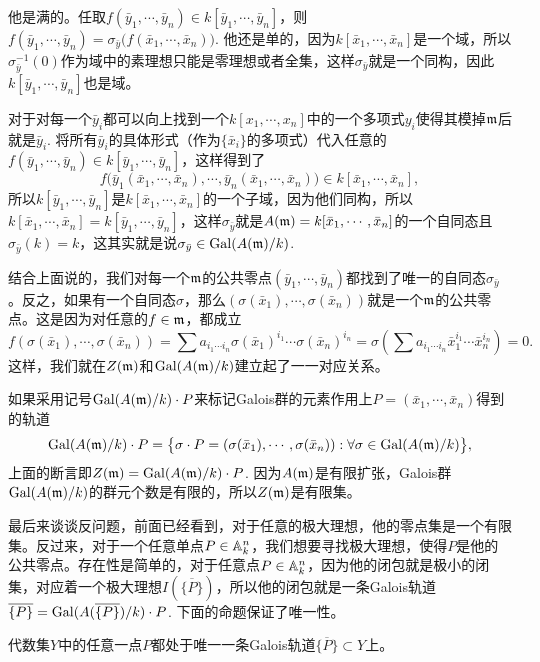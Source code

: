 他是满的。任取$f(\bar{y}_1,\cdots,\bar{y}_n)\in k[\bar{y}_1,\cdots,\bar{y}_n]$，则$f(\bar{y}_1,\cdots,\bar{y}_n)=\sigma_{\bar{y}}\bigl(f(\bar{x}_1,\cdots,\bar{x}_n)\bigr)$. 
他还是单的，因为$k[\bar{x}_1,\cdots,\bar{x}_n]$是一个域，所以$\sigma_{\bar{y}}^{-1}(0)$作为域中的素理想只能是零理想或者全集，这样$\sigma_{\bar{y}}$就是一个同构，因此$k[\bar{y}_1,\cdots,\bar{y}_n]$也是域。

对于对每一个$\bar{y}_i$都可以向上找到一个$k[x_1,\cdots,x_n]$中的一个多项式$y_i$使得其模掉$\mathfrak{m}$后就是$\bar{y}_i$.
将所有$\bar{y}_i$的具体形式（作为$\{\bar{x}_i\}$的多项式）代入任意的$f(\bar{y}_1,\cdots,\bar{y}_n) \in k[\bar{y}_1,\cdots,\bar{y}_n]$，这样得到了
\[
	f\bigl(\bar{y}_1(\bar{x}_1,\cdots,\bar{x}_n),\cdots,\bar{y}_n(\bar{x}_1,\cdots,\bar{x}_n)\bigr) \in k[\bar{x}_1,\cdots,\bar{x}_n],
\]
所以$k[\bar{y}_1,\cdots,\bar{y}_n]$是$k[\bar{x}_1,\cdots,\bar{x}_n]$的一个子域，因为他们同构，所以$k[\bar{x}_1,\cdots,\bar{x}_n]=k[\bar{y}_1,\cdots,\bar{y}_n]$，这样$\sigma_{\bar{y}}$就是$A(\mathfrak{m})=k[\bar{x}_1,\cdots,\bar{x}_n]$的一个自同态且$\sigma_{\bar{y}}(k)=k$，这其实就是说$\sigma_{\bar{y}}\in \operatorname{Gal}(A(\mathfrak{m})/k)$.

结合上面说的，我们对每一个$\mathfrak{m}$的公共零点$(\bar{y}_1,\cdots,\bar{y}_n)$都找到了唯一的自同态$\sigma_{\bar{y}}$。反之，如果有一个自同态$\sigma$，那么$(\sigma(\bar{x}_1),\cdots,\sigma(\bar{x}_n))$就是一个$\mathfrak{m}$的公共零点。这是因为对任意的$f\in\mathfrak{m}$，都成立
\[
	f(\sigma(\bar{x}_1),\cdots,\sigma(\bar{x}_n))=\sum a_{i_1\cdots i_n} \sigma({\bar{x}}_1)^{i_1}\cdots \sigma({\bar{x}}_n)^{i_n}=\sigma\left(\sum a_{i_1\cdots i_n} \bar{x}_1^{i_1}\cdots \bar{x}_n^{i_n}\right)=0.
\]
这样，我们就在$Z(\mathfrak{m})$和$\operatorname{Gal}(A(\mathfrak{m})/k)$建立起了一一对应关系。

\para 如果采用记号$\operatorname{Gal}(A(\mathfrak{m})/k)\cdot P$来标记Galois群的元素作用上$P=(\bar{x}_1,\cdots,\bar{x}_n)$得到的轨道
\[
	\operatorname{Gal}(A(\mathfrak{m})/k)\cdot P=\bigl\{\sigma\cdot P=(\sigma(\bar{x}_1),\cdots,\sigma(\bar{x}_n)):\forall \sigma\in \operatorname{Gal}(A(\mathfrak{m})/k)\bigr\},
\]
上面的断言即$Z(\mathfrak{m})=\operatorname{Gal}(A(\mathfrak{m})/k)\cdot P$. 因为$A(\mathfrak{m})$是有限扩张，Galois群$\operatorname{Gal}(A(\mathfrak{m})/k)$的群元个数是有限的，所以$Z(\mathfrak{m})$是有限集。

最后来谈谈反问题，前面已经看到，对于任意的极大理想，他的零点集是一个有限集。反过来，对于一个任意单点$P\in \mathbb{A}^n_k$，我们想要寻找极大理想，使得$P$是他的公共零点。存在性是简单的，对于任意点$P\in \mathbb{A}^n_k$，因为他的闭包就是极小的闭集，对应着一个极大理想$I(\overline{\{P\}})$，所以他的闭包就是一条Galois轨道$\overline{\{P\}}=\operatorname{Gal}(A(\overline{\{P\}})/k)\cdot P$. 下面的命题保证了唯一性。

\lem 代数集$Y$中的任意一点$P$都处于唯一一条Galois轨道$\overline{\{P\}}\subset Y$上。

